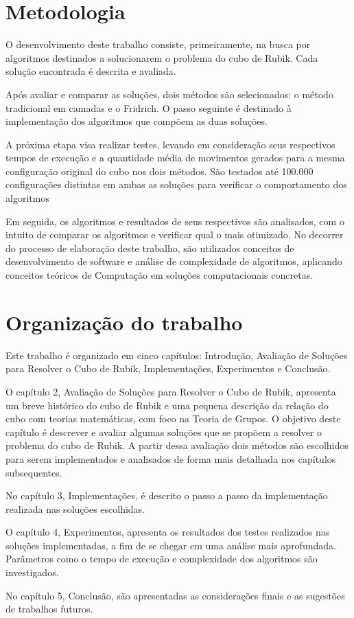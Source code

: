 \section{Metodologia}

O desenvolvimento deste trabalho consiste, primeiramente, na busca por algoritmos destinados a solucionarem o problema do cubo de Rubik. Cada solução encontrada é descrita e avaliada. 


Após avaliar e comparar as soluções, dois métodos são selecionados: o método tradicional em camadas e o Fridrich. O passo seguinte é destinado à implementação dos algoritmos que compõem as duas soluções. 


A próxima etapa visa realizar testes, levando em consideração seus respectivos tempos de execução e a quantidade média de movimentos gerados para a mesma configuração original do cubo nos dois métodos. São testados até 100.000 configurações distintas em ambas as soluções para verificar o comportamento dos algoritmos


Em seguida, os algoritmos e resultados de seus respectivos são analisados, com o intuito de comparar os algoritmos e verificar qual o mais otimizado. No decorrer do processo de elaboração deste trabalho, são utilizados conceitos de desenvolvimento de software e análise de complexidade de algoritmos, aplicando conceitos teóricos de Computação em soluções computacionais concretas.



\section{Organização do trabalho}

Este trabalho é organizado em cinco capítulos: Introdução, Avaliação de Soluções para Resolver o Cubo de Rubik, Implementações, Experimentos e Conclusão.

O capítulo 2, Avaliação de Soluções para Resolver o Cubo de Rubik, apresenta um breve histórico do cubo de Rubik e uma pequena descrição da relação do cubo com teorias matemáticas, com foco na Teoria de Grupos. O objetivo deste capítulo é descrever e avaliar algumas soluções que se propõem a resolver o problema do cubo de Rubik. A partir dessa avaliação dois métodos são escolhidos para serem implementados e analisados de forma mais detalhada nos capítulos subsequentes.

No capítulo 3, Implementações, é descrito o passo a passo da implementação realizada nas soluções escolhidas.

O capítulo 4, Experimentos, apresenta os resultados dos testes realizados nas soluções implementadas, a fim de se chegar em uma análise mais aprofundada. Parâmetros como o tempo de execução e complexidade dos algoritmos são investigados.

No capítulo 5, Conclusão, são apresentadas as considerações finais e as sugestões de trabalhos futuros.